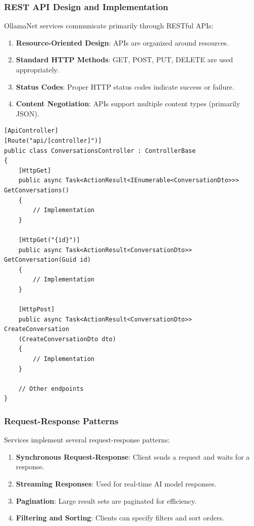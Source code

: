 \subsubsection{REST API Design and Implementation}

OllamaNet services communicate primarily through RESTful APIs:

\begin{enumerate}
   \item \textbf{Resource-Oriented Design}: APIs are organized around resources.
   \item \textbf{Standard HTTP Methods}: GET, POST, PUT, DELETE are used appropriately.
   \item \textbf{Status Codes}: Proper HTTP status codes indicate success or failure.
   \item \textbf{Content Negotiation}: APIs support multiple content types (primarily JSON).
\end{enumerate}

\begin{verbatim}
[ApiController]
[Route("api/[controller]")]
public class ConversationsController : ControllerBase
{
    [HttpGet]
    public async Task<ActionResult<IEnumerable<ConversationDto>>> GetConversations()
    {
        // Implementation
    }
    
    [HttpGet("{id}")]
    public async Task<ActionResult<ConversationDto>> GetConversation(Guid id)
    {
        // Implementation
    }
    
    [HttpPost]
    public async Task<ActionResult<ConversationDto>> CreateConversation
    (CreateConversationDto dto)
    {
        // Implementation
    }
    
    // Other endpoints
}
\end{verbatim}

\subsubsection{Request-Response Patterns}

Services implement several request-response patterns:

\begin{enumerate}
   \item \textbf{Synchronous Request-Response}: Client sends a request and waits for a response.
   \item \textbf{Streaming Responses}: Used for real-time AI model responses.
   \item \textbf{Pagination}: Large result sets are paginated for efficiency.
   \item \textbf{Filtering and Sorting}: Clients can specify filters and sort orders.
\end{enumerate}


